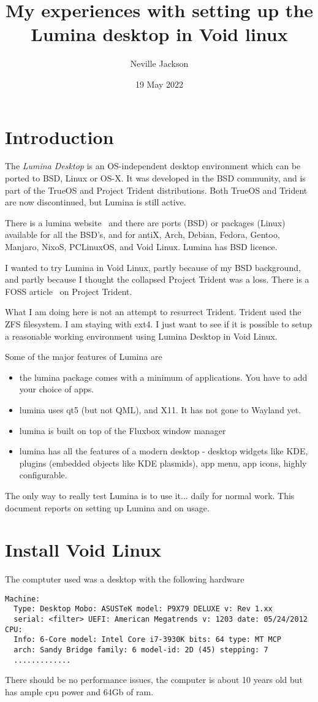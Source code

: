 \documentclass{article}  %
\title{My experiences with setting up the Lumina desktop in Void linux}
\author{Neville Jackson}
\date{19 May 2022}
\begin{document}
 

\maketitle      

\section{Introduction} 
The {\em Lumina Desktop} is an OS-independent desktop environment which can be ported to BSD, Linux or OS-X. It was developed in the BSD community, and is part of the TrueOS and Project Trident distributions. Both TrueOS and Trident are now discontinued, but Lumina is still active. 

There is a lumina website~\cite{lumi:22} and there are ports (BSD) or packages (Linux) available for all the BSD's, and for antiX, Arch, Debian, Fedora, Gentoo, Manjaro, NixoS, PCLinuxOS, and Void Linux. Lumina has  BSD licence.

I wanted to try Lumina in Void Linux, partly because of my BSD background, and partly because I thought the collapsed Project Trident was a loss. There is a FOSS article~\cite{foss:21} on Project Trident. 

What I am doing here is not an attempt to resurrect Trident. Trident used the ZFS filesystem. I am staying with ext4. I just want to see if it is possible to setup a reasonable working environment using Lumina Desktop in Void Linux. 

Some of the major features of Lumina are
\begin{itemize}
\item the lumina package comes with a minimum of applications. You have to add your choice of apps.
\item lumina uses qt5 (but not QML), and X11. It has not gone to Wayland yet.
\item lumina is built on top of the Fluxbox window manager
\item lumina has all the features of a modern desktop - desktop widgets like KDE, plugins (embedded objects like KDE plasmids), app menu, app icons, highly configurable. 
\end{itemize}

The only way to really test Lumina is to use it... daily for normal work.  This document reports on setting up Lumina and on usage.

\section{Install Void Linux }
\label{sec:install}
The comptuter used  was a desktop with the following hardware 
\begin{verbatim}
Machine:
  Type: Desktop Mobo: ASUSTeK model: P9X79 DELUXE v: Rev 1.xx 
  serial: <filter> UEFI: American Megatrends v: 1203 date: 05/24/2012 
CPU:
  Info: 6-Core model: Intel Core i7-3930K bits: 64 type: MT MCP 
  arch: Sandy Bridge family: 6 model-id: 2D (45) stepping: 7 
  .............
\end{verbatim}
There should be no performance issues, the computer is about 10 years old but has ample cpu power and 64Gb of ram.
\end{document}
